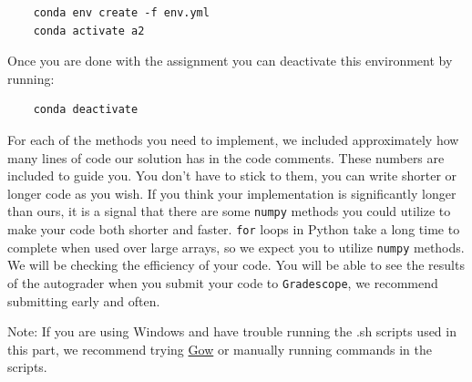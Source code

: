 \documentclass{article}
\begin{document}
    \begin{verbatim}
    conda env create -f env.yml
    conda activate a2
    \end{verbatim}

    Once you are done with the assignment you can deactivate this environment by running:
    \begin{verbatim}
    conda deactivate
    \end{verbatim}

    For each of the methods you need to implement, we included approximately how many lines of code our solution has in the code comments. These numbers are included to guide you. You don't have to stick to them, you can write shorter or longer code as you wish. If you think your implementation is significantly longer than ours, it is a signal that there are some \texttt{numpy} methods you could utilize to make your code both shorter and faster. \texttt{for} loops in Python take a long time to complete when used over large arrays, so we expect you to utilize \texttt{numpy} methods. We will be checking the efficiency of your code. You will be able to see the results of the autograder when you submit your code to \texttt{Gradescope}, we recommend submitting early and often.

    Note: If you are using Windows and have trouble running the .sh scripts used in this part, we recommend trying \href{https://github.com/bmatzelle/gow}{Gow} or manually running commands in the scripts.
\end{document}

